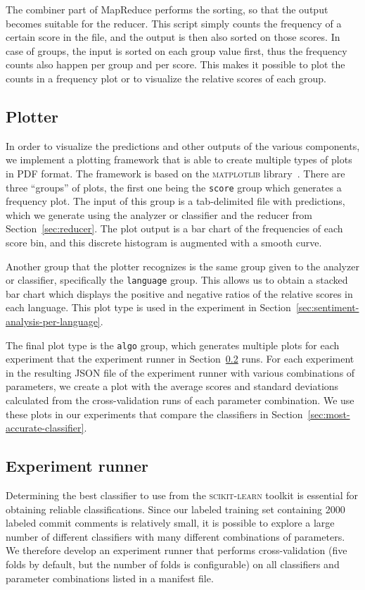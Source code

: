 \documentclass{article}
\begin{document}
The combiner part of MapReduce performs the sorting, so that the output becomes 
suitable for the reducer. This script simply counts the frequency of a certain 
score in the file, and the output is then also sorted on those scores. In case 
of groups, the input is sorted on each group value first, thus the frequency
counts also happen per group and per score. This makes it possible to plot the
counts in a frequency plot or to visualize the relative scores of each group.

\subsection{Plotter}\label{sec:plotter}
In order to visualize the predictions and other outputs of the various 
components, we implement a plotting framework that is able to create multiple 
types of plots in PDF format. The framework is based on the \textsc{matplotlib} 
library~\cite{hunter2007matplotlib}. There are three ``groups'' of plots, the 
first one being the \texttt{score} group which generates a frequency plot. The 
input of this group is a tab-delimited file with predictions, which we generate 
using the analyzer or classifier and the reducer from 
Section~\ref{sec:reducer}. The plot output is a bar chart of the frequencies of 
each score bin, and this discrete histogram is augmented with a smooth curve.

Another group that the plotter recognizes is the same group given to the 
analyzer or classifier, specifically the \texttt{language} group. This allows 
us to obtain a stacked bar chart which displays the positive and negative 
ratios of the relative scores in each language. This plot type is used in the 
experiment in Section~\ref{sec:sentiment-analysis-per-language}.

The final plot type is the \texttt{algo} group, which generates multiple plots 
for each experiment that the experiment runner in 
Section~\ref{sec:experiment-runner} runs. For each experiment in the resulting 
JSON file of the experiment runner with various combinations of parameters, we 
create a plot with the average scores and standard deviations calculated from 
the cross-validation runs of each parameter combination. We use these plots in 
our experiments that compare the classifiers in 
Section~\ref{sec:most-accurate-classifier}.

\subsection{Experiment runner}\label{sec:experiment-runner}
Determining the best classifier to use from the \textsc{scikit-learn} toolkit is
essential for obtaining reliable classifications. Since our labeled training
set containing 2000 labeled commit comments is relatively small, it is possible
to explore a large number of different classifiers with many different
combinations of parameters. We therefore develop an experiment runner that
performs cross-validation (five folds by default, but the number of folds is
configurable) on all classifiers and parameter combinations listed in a
manifest file.
\end{document}
